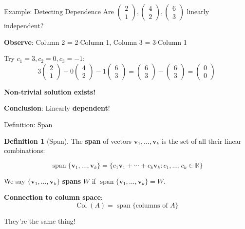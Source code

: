 \documentclass[10pt]{beamer}
\theoremstyle{definition}
\newtheorem{defi}{Definition}[section]
\newcommand{\x}[1]{\alert{\textbf{#1}}}
\begin{document}
\begin{frame}{Example: Detecting Dependence}
Are $\begin{pmatrix} 2 \\ 1 \end{pmatrix}, \begin{pmatrix} 4 \\ 2 \end{pmatrix}, \begin{pmatrix} 6 \\ 3 \end{pmatrix}$ linearly independent?

\vfill
\textbf{Observe}: Column 2 = 2$\cdot$Column 1, Column 3 = 3$\cdot$Column 1

\vfill
Try $c_1 = 3, c_2 = 0, c_3 = -1$:
$$3\begin{pmatrix} 2 \\ 1 \end{pmatrix} + 0\begin{pmatrix} 4 \\ 2 \end{pmatrix} - 1\begin{pmatrix} 6 \\ 3 \end{pmatrix} = \begin{pmatrix} 6 \\ 3 \end{pmatrix} - \begin{pmatrix} 6 \\ 3 \end{pmatrix} = \begin{pmatrix} 0 \\ 0 \end{pmatrix}$$

\vfill
\x{Non-trivial solution exists!}

\vfill
\x{Conclusion}: Linearly \x{dependent}!
\end{frame}

\begin{frame}{Definition: Span}
\begin{defi}[Span]
The \x{span} of vectors $\mathbf{v}_1, \ldots, \mathbf{v}_k$ is the set of all their linear combinations:

$$\operatorname{span}\{\mathbf{v}_1, \ldots, \mathbf{v}_k\} = \{ c_1\mathbf{v}_1 + \cdots + c_k\mathbf{v}_k : c_1, \ldots, c_k \in \mathbb{R} \}$$

We say $\{\mathbf{v}_1, \ldots, \mathbf{v}_k\}$ \x{spans} $W$ if $\operatorname{span}\{\mathbf{v}_1, \ldots, \mathbf{v}_k\} = W$.
\end{defi}

\vfill
\x{Connection to column space}:
$$\operatorname{Col}(A) = \operatorname{span}\{\text{columns of } A\}$$

They're the same thing!
\end{frame}
\end{document}
